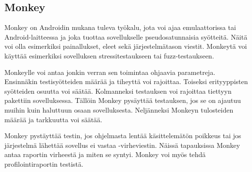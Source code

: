 \subsection{Monkey}

Monkey on Androidin mukana tuleva työkalu, jota voi ajaa emulaattorissa tai Android-laitteessa ja joka tuottaa sovellukselle pseudosatunnaisia syötteitä. Näitä voi olla esimerkiksi painallukset, eleet sekä järjestelmätason viestit. Monkeytä voi käyttää esimerkiksi sovelluksen stressitestaukseen tai fuzz-testaukseen.

Monkeylle voi antaa jonkin verran sen toimintaa ohjaavia parametreja. Ensinnäkin testisyötteiden määrää ja tiheyttä voi rajoittaa. Toiseksi erityyppisten syötteiden osuutta voi säätää. Kolmanneksi testauksen voi rajoittaa tiettyyn pakettiin sovelluksessa. Tällöin Monkey pysäyttää testauksen, jos se on ajautuu muihin kuin haluttuun osaan sovelluksesta. Neljänneksi Monkeyn tulosteiden määrää ja tarkkuutta voi säätää.

Monkey pystäyttää testin, jos ohjelmasta lentää käsittelemätön poikkeus tai jos järjestelmä lähettää sovellus ei vastaa -virheviestin. Näissä tapauksissa Monkey antaa raportin virheestä ja miten se syntyi. Monkey voi myös tehdä profilointiraportin testistä.\cite{android}